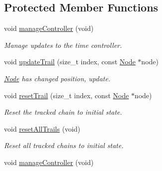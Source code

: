 \subsection*{Protected Member Functions}
\begin{DoxyCompactItemize}
\item 
\mbox{\label{classPURibbonTrail_a9386aa10b2c9e83b10378c3efc211fb5}} 
void \hyperlink{classPURibbonTrail_a9386aa10b2c9e83b10378c3efc211fb5}{manage\+Controller} (void)
\begin{DoxyCompactList}\small\item\em Manage updates to the time controller. \end{DoxyCompactList}\item 
\mbox{\label{classPURibbonTrail_a0cc8552c45972e4d612177321e7dfd1b}} 
void \hyperlink{classPURibbonTrail_a0cc8552c45972e4d612177321e7dfd1b}{update\+Trail} (size\+\_\+t index, const \hyperlink{classNode}{Node} $\ast$node)
\begin{DoxyCompactList}\small\item\em \hyperlink{classNode}{Node} has changed position, update. \end{DoxyCompactList}\item 
\mbox{\label{classPURibbonTrail_adb8130d276a73559b0abc864af60dc64}} 
void \hyperlink{classPURibbonTrail_adb8130d276a73559b0abc864af60dc64}{reset\+Trail} (size\+\_\+t index, const \hyperlink{classNode}{Node} $\ast$node)
\begin{DoxyCompactList}\small\item\em Reset the tracked chain to initial state. \end{DoxyCompactList}\item 
\mbox{\label{classPURibbonTrail_a3fd6b55cc4412cad9ab41586c2af9986}} 
void \hyperlink{classPURibbonTrail_a3fd6b55cc4412cad9ab41586c2af9986}{reset\+All\+Trails} (void)
\begin{DoxyCompactList}\small\item\em Reset all tracked chains to initial state. \end{DoxyCompactList}\item 
\mbox{\label{classPURibbonTrail_a9386aa10b2c9e83b10378c3efc211fb5}} 
void \hyperlink{classPURibbonTrail_a9386aa10b2c9e83b10378c3efc211fb5}{manage\+Controller} (void)

\end{DoxyCompactItemize}

